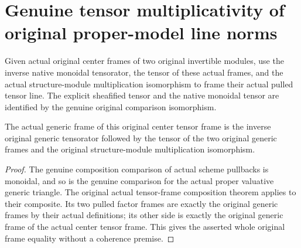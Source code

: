 \section{Genuine tensor multiplicativity of original proper-model line norms}

\begin{definition}
\label{def:actual-center-line-tensor-frame}
\leanok
{}
Given actual original center frames of two original invertible
modules, use the inverse native monoidal tensorator, the tensor of
these actual frames, and the actual structure-module multiplication
isomorphism to frame their actual pulled tensor line. The explicit
sheafified tensor and the native monoidal tensor are identified by
the genuine original comparison isomorphism.
\end{definition}

\begin{lemma}
\label{lem:actual-center-generic-tensor-frame}
\leanok
{}
The actual generic frame of this original center tensor frame is
the inverse original generic tensorator followed by the tensor of
the two original generic frames and the original structure-module
multiplication isomorphism.
\end{lemma}
\begin{proof}
The genuine composition comparison of actual scheme pullbacks is
monoidal, and so is the genuine comparison for the actual proper
valuative generic triangle. The original actual tensor-frame
composition theorem applies to their composite. Its two pulled
factor frames are exactly the original generic frames by their
actual definitions; its other side is exactly the original generic
frame of the actual center tensor frame. This gives the asserted
whole original frame equality without a coherence premise.
\end{proof}

